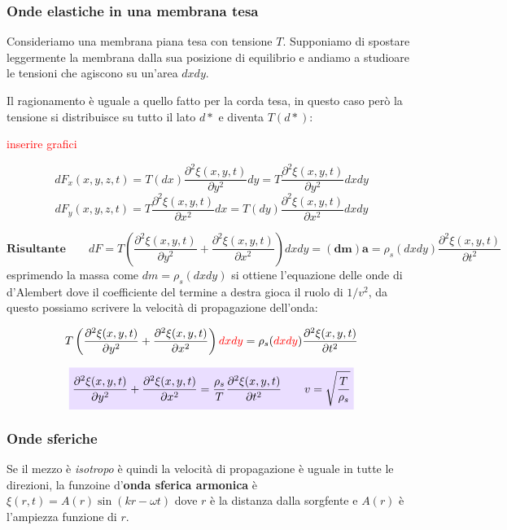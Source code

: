 \documentclass[x11names]{article}
\newcommand{\viola}[1]{\colorbox{myred}{$\displaystyle #1$}}
\begin{document}
	\subsubsection{Onde elastiche in una membrana tesa}
	Consideriamo una membrana piana tesa con tensione \(T\). Supponiamo di spostare leggermente la membrana dalla sua posizione di equilibrio e andiamo a studioare le tensioni che agiscono su un'area \(dxdy\). 
	
	Il ragionamento è uguale a quello fatto per la corda tesa, in questo caso però la tensione si distribuisce su tutto il lato \(d*\) e diventa \(T(d*)\):
	
	\begin{center}
		\textcolor{red}{inserire grafici}
	\end{center}
	
	\[ 
	dF_x(x,y,z,t) = T(dx)\frac{\partial^2 \xi(x,y,t)}{\partial y^2}dy = T\frac{\partial^2\xi(x,y,t)}{\partial y^2}dxdy
	\]
	\[ 
	dF_y(x,y,z,t) = T\frac{\partial^2 \xi(x,y,t)}{\partial x^2}dx = T(dy)\frac{\partial^2\xi(x,y,t)}{\partial x^2}dxdy 
	\]
	
	\[ 
	\textbf{Risultante} \qquad	dF = T\left(\frac{\partial^2\xi(x,y,t)}{\partial y^2} + \frac{\partial^2\xi(x,y,t)}{\partial x^2}\right)dxdy \mathbf{=(dm)a = }  \rho_s(dxdy)\frac{\partial^2\xi(x,y,t)}{\partial t^2}
	\]
	esprimendo la massa come \(dm = \rho_s (dxdy)\) si ottiene l'equazione delle onde di d'Alembert dove il coefficiente del termine a destra gioca il ruolo di \(1/v^2\), da questo possiamo scrivere la velocità di propagazione dell'onda:
	
	\[ 
	T\left(\frac{\partial^2\xi(x,y,t)}{\partial y^2} + \frac{\partial^2\xi(x,y,t)}{\partial x^2}\right)\textcolor{red}{dxdy} = \rho_s(\textcolor{red}{dxdy})\frac{\partial^2\xi(x,y,t)}{\partial t^2}
	\]
	
	
	\begin{equation}
		\viola{\frac{\partial^2\xi(x,y,t)}{\partial y^2} + \frac{\partial^2\xi(x,y,t)}{\partial x^2} = \frac{\rho_s}{T}\frac{\partial^2\xi(x,y,t)}{\partial t^2} \qquad v = \sqrt{\frac{T}{\rho_s}}}
	\end{equation}

	
	
	
	\subsubsection{Onde sferiche}
	Se il mezzo è \textit{isotropo} è quindi la velocità di propagazione è uguale in tutte le direzioni, la funzoine d'\textbf{onda sferica armonica} è \(\xi(r,t) = A(r)\sin\left(kr -\omega t\right)\) dove \(r\) è la distanza dalla sorgfente e \(A(r)\) è l'ampiezza funzione di \(r\). \\
	
\end{document}
